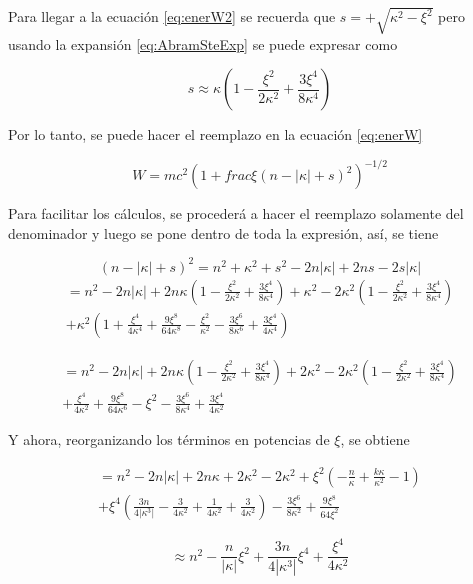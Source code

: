 \documentclass[a4paper, 12pt]{article} %
\begin{document}
Para llegar a la ecuaci\'on \ref{eq:enerW2} se recuerda que $s=+\sqrt{\kappa^2-\xi^2}$ pero usando la expansi\'on \ref{eq:AbramSteExp} se puede expresar como 

\begin{equation}
s\approx \kappa \left( 1-\frac{\xi^2}{2\kappa^2}+\frac{3\xi^4}{8\kappa^4}  \right)
\end{equation}

Por lo tanto, se puede hacer el reemplazo en la ecuaci\'on \ref{eq:enerW}

\begin{equation}
W = mc^2 \left(1+frac{\xi}{(n-|\kappa|+s)^2} \right)^{-1/2}
\end{equation}

Para facilitar los c\'alculos, se proceder\'a a hacer el reemplazo solamente del denominador y luego se pone dentro de toda la expresi\'on, as\'i, se tiene

\[
(n-|\kappa| + s)^2 = n^2 + \kappa^2 + s^2 -2n|\kappa| +2ns -2s|\kappa| 
\]
\[
\begin{split}
= n^2-2n|\kappa|+2n\kappa \left( 1-\frac{\xi^2}{2\kappa^2} +\frac{3\xi^4}{8\kappa^4} \right) +\kappa^2 -2\kappa^2 \left( 1-\frac{\xi^2}{2\kappa^2} +\frac{3\xi^4}{8\kappa^4} \right) \\
+ \kappa^2 \left(  1+\frac{\xi^4}{4\kappa^4} +\frac{9\xi^8}{64\kappa^8} -\frac{\xi^2}{\kappa^2} -\frac{3\xi^6}{8\kappa^6} + \frac{3\xi^4}{4\kappa^4} \right)
\end{split}
\]

\[
\begin{split}
=n^2-2n|\kappa| +2n\kappa \left( 1-\frac{\xi^2}{2\kappa^2} +\frac{3\xi^4}{8\kappa^4} \right) +2\kappa^2 -2\kappa^2 \left( 1-\frac{\xi^2}{2\kappa^2} +\frac{3\xi^4}{8\kappa^4} \right) \\
+\frac{\xi^4}{4\kappa^2} +\frac{9\xi^8}{64\kappa^6} -\xi^2 -\frac{3\xi^6}{8\kappa^4} + \frac{3\xi^4}{4\kappa^2}
\end{split}
\]

Y ahora, reorganizando los t\'erminos en potencias de  $\xi$, se obtiene

\[
\begin{split}
=n^2 -2n|\kappa| + 2n\kappa + 2\kappa^2 - 2\kappa^2 + \xi^2 \left(  -\frac{n}{\kappa} + \frac{k\kappa}{\kappa^2} -1 \right) \\
+ \xi^4 \left(  \frac{3n}{4|\kappa^3|} -\frac{3}{4\kappa^2} +\frac{1}{4\kappa^2} + \frac{3}{4\kappa^2}  \right)  -\frac{3\xi^6}{8\kappa^2} + \frac{9\xi^8}{64\xi^2}
\end{split}
\]

\[
\approx n^2 - \frac{n}{|\kappa|}\xi^2 +\frac{3n}{4|\kappa^3|}\xi^4 +\frac{\xi^4}{4\kappa^2}
\]








\end{document}
